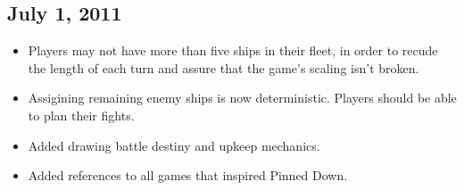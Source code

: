 \documentclass[11pt, a4paper]{article}
\begin{document}
\subsection{July 1, 2011}

\begin{itemize}
 \item Players may not have more than five ships in their fleet, in order to
recude the length of each turn and assure that the game's scaling isn't broken.
 \item Assigining remaining enemy ships is now deterministic. Players should be
able to plan their fights.
 \item Added drawing battle destiny and upkeep mechanics.
 \item Added references to all games that inspired Pinned Down.
\end{itemize}
\end{document}
